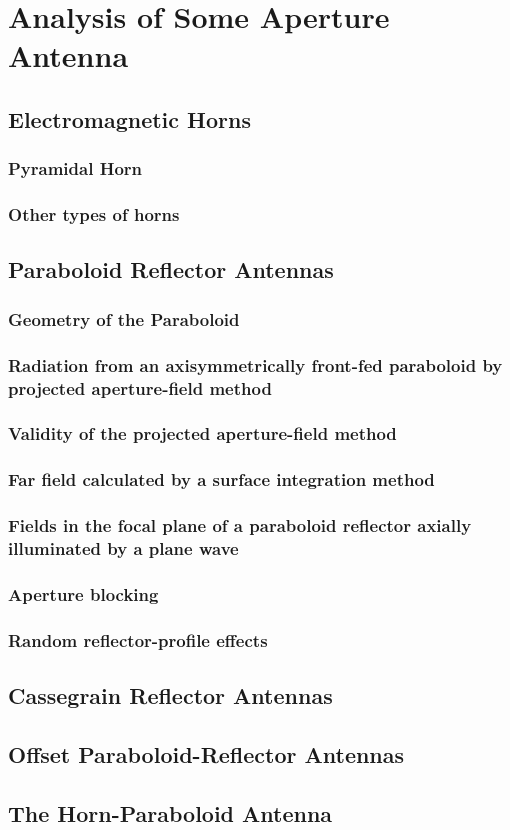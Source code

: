 \chapter{Analysis of Some Aperture Antenna}
\label{ch:apeant}

\section{Electromagnetic Horns}
\subsection{Pyramidal Horn}
\subsection{Other types of horns}

\section{Paraboloid Reflector Antennas}
\subsection{Geometry of the Paraboloid}
\subsection{Radiation from an axisymmetrically front-fed paraboloid by projected aperture-field method}
\subsection{Validity of the projected aperture-field method}
\subsection{Far field calculated by a surface integration method}
\subsection{Fields in the focal plane of a paraboloid reflector axially illuminated by a plane wave}
\subsection{Aperture blocking}
\subsection{Random reflector-profile effects}

\section{Cassegrain Reflector Antennas}

\section{Offset Paraboloid-Reflector Antennas}

\section{The Horn-Paraboloid Antenna}